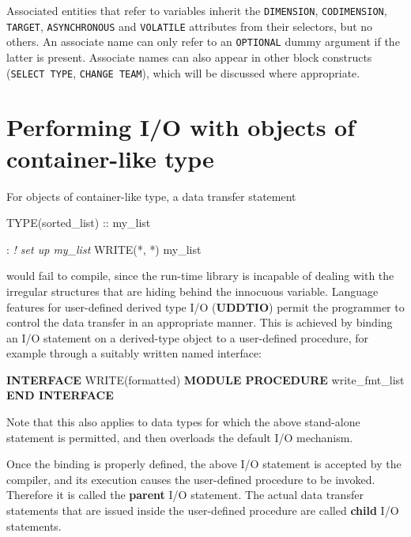 \documentclass[
]{scrartcl}
\newenvironment{Shaded}{}{}
\newcommand{\CommentTok}[1]{\textcolor[rgb]{0.38,0.63,0.69}{\textit{#1}}}
\newcommand{\DataTypeTok}[1]{\textcolor[rgb]{0.56,0.13,0.00}{#1}}
\newcommand{\FunctionTok}[1]{\textcolor[rgb]{0.02,0.16,0.49}{#1}}
\newcommand{\KeywordTok}[1]{\textcolor[rgb]{0.00,0.44,0.13}{\textbf{#1}}}
\newcommand{\NormalTok}[1]{#1}
\begin{document}
Associated entities that refer to variables inherit the
\texttt{DIMENSION}, \texttt{CODIMENSION}, \texttt{TARGET},
\texttt{ASYNCHRONOUS} and \texttt{VOLATILE} attributes from their
selectors, but no others. An associate name can only refer to an
\texttt{OPTIONAL} dummy argument if the latter is present. Associate
names can also appear in other block constructs (\texttt{SELECT\ TYPE},
\texttt{CHANGE\ TEAM}), which will be discussed where appropriate.

\section{Performing I/O with objects of container-like
type}\label{performing-io-with-objects-of-container-like-type}

For objects of container-like type, a data transfer statement

\begin{Shaded}
\begin{Highlighting}[]
\DataTypeTok{TYPE(sorted\_list)} \DataTypeTok{::}\NormalTok{ my\_list}

\NormalTok{: }\CommentTok{! set up my\_list}
\FunctionTok{WRITE(*}\NormalTok{, }\FunctionTok{*)}\NormalTok{ my\_list}
\end{Highlighting}
\end{Shaded}

would fail to compile, since the run-time library is incapable of
dealing with the irregular structures that are hiding behind the
innocuous variable. Language features for user-defined derived type I/O
(\textbf{UDDTIO}) permit the programmer to control the data transfer in
an appropriate manner. This is achieved by binding an I/O statement on a
derived-type object to a user-defined procedure, for example through a
suitably written named interface:

\begin{Shaded}
\begin{Highlighting}[]
\KeywordTok{INTERFACE} \FunctionTok{WRITE(formatted)}
   \KeywordTok{MODULE PROCEDURE}\NormalTok{ write\_fmt\_list}
\KeywordTok{END INTERFACE}
\end{Highlighting}
\end{Shaded}

Note that this also applies to data types for which the above
stand-alone statement is permitted, and then overloads the default I/O
mechanism.

Once the binding is properly defined, the above I/O statement is
accepted by the compiler, and its execution causes the user-defined
procedure to be invoked. Therefore it is called the \textbf{parent} I/O
statement. The actual data transfer statements that are issued inside
the user-defined procedure are called \textbf{child} I/O statements.
\end{document}
